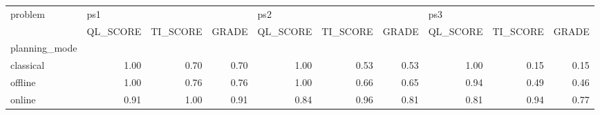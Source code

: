 \begin{tabular}{lrrrrrrrrr}
\toprule
problem & \multicolumn{3}{l}{ps1} & \multicolumn{3}{l}{ps2} & \multicolumn{3}{l}{ps3} \\
{} & QL\_SCORE & TI\_SCORE & GRADE & QL\_SCORE & TI\_SCORE & GRADE & QL\_SCORE & TI\_SCORE & GRADE \\
planning\_mode &          &          &       &          &          &       &          &          &       \\
\midrule
classical     &     1.00 &     0.70 &  0.70 &     1.00 &     0.53 &  0.53 &     1.00 &     0.15 &  0.15 \\
offline       &     1.00 &     0.76 &  0.76 &     1.00 &     0.66 &  0.65 &     0.94 &     0.49 &  0.46 \\
online        &     0.91 &     1.00 &  0.91 &     0.84 &     0.96 &  0.81 &     0.81 &     0.94 &  0.77 \\
\bottomrule
\end{tabular}
